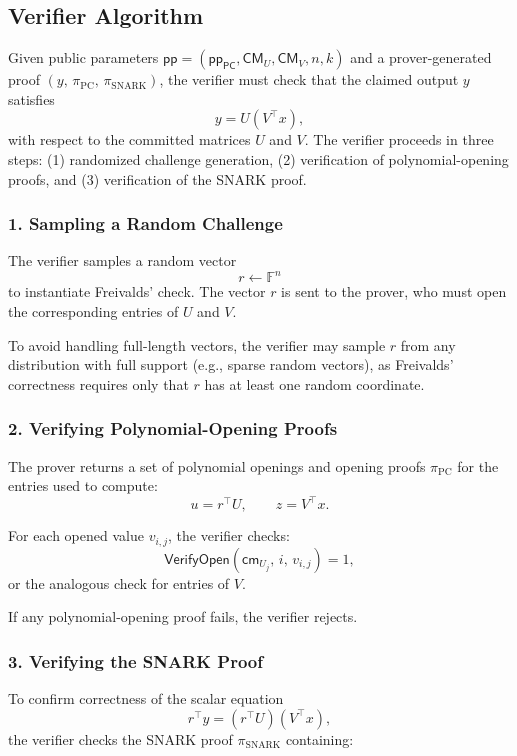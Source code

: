 \documentclass[11pt]{article}
\begin{document}
\subsection{Verifier Algorithm}

Given public parameters 
$\mathsf{pp} = (\mathsf{pp}_{\mathsf{PC}}, \mathsf{CM}_U, \mathsf{CM}_V, n, k)$ 
and a prover-generated proof 
$(y,\, \pi_{\mathrm{PC}},\, \pi_{\mathrm{SNARK}})$,
the verifier must check that the claimed output $y$ satisfies
\[
  y = U(V^\top x),
\]
with respect to the committed matrices $U$ and $V$.
The verifier proceeds in three steps:
(1) randomized challenge generation,  
(2) verification of polynomial-opening proofs, and  
(3) verification of the SNARK proof.

\subsubsection{1. Sampling a Random Challenge}

The verifier samples a random vector
\[
  r \leftarrow \mathbb{F}^n
\]
to instantiate Freivalds' check.
The vector $r$ is sent to the prover, who must open the corresponding
entries of $U$ and $V$.

To avoid handling full-length vectors, the verifier may sample $r$ from
any distribution with full support (e.g., sparse random vectors), as
Freivalds' correctness requires only that $r$ has at least one random
coordinate.

\subsubsection{2. Verifying Polynomial-Opening Proofs}

The prover returns a set of polynomial openings and opening proofs 
$\pi_{\mathrm{PC}}$ for the entries used to compute:
\[
  u = r^\top U, 
  \qquad
  z = V^\top x.
\]

For each opened value $v_{i,j}$, the verifier checks:
\[
  \mathsf{VerifyOpen}(\mathsf{cm}_{U_j},\, i,\, v_{i,j}) = 1,
\]
or the analogous check for entries of $V$.

If any polynomial-opening proof fails, the verifier rejects.

\subsubsection{3. Verifying the SNARK Proof}

To confirm correctness of the scalar equation
\[
  r^\top y = (r^\top U)(V^\top x),
\]
the verifier checks the SNARK proof $\pi_{\mathrm{SNARK}}$ containing:
\end{document}
